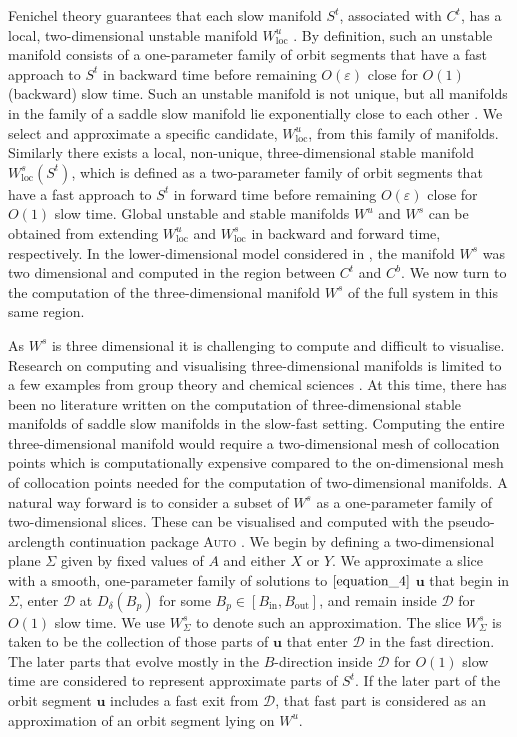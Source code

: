 \documentclass{ws-ijbc}
\begin{document}
Fenichel theory guarantees that each slow manifold $S^t$, associated with $C^t$, has a local, two-dimensional unstable manifold $W_{\mathrm{loc}}^u$ \cite{Fenichel}.  By definition, such an unstable manifold consists of a one-parameter family of orbit segments that have a fast approach to $S^t$ in backward time before remaining $O(\varepsilon)$ close for $O(1)$ (backward) slow time.  Such an unstable manifold is not unique, but all manifolds in the family of a saddle slow manifold lie exponentially close to each other \cite{Fenichel}.  We select and approximate a specific candidate, $W_{\mathrm{loc}}^u$, from this family of manifolds.  Similarly there exists a local, non-unique, three-dimensional stable manifold $W^s_{\mathrm{loc}}(S^t)$, which is defined as a two-parameter family of orbit segments that have a fast approach to $S^t$ in forward time before remaining $O(\varepsilon)$ close for $O(1)$ slow time.  Global unstable and stable manifolds $W^u$ and $W^s$ can be obtained from extending $W^u_{\mathrm{loc}}$ and $W^s_{\mathrm{loc}}$ in backward and forward time, respectively.  In the lower-dimensional model considered in \cite{QSSA}, the manifold $W^s$ was two dimensional and computed in the region between $C^t$ and $C^b$.  We now turn to the computation of the three-dimensional manifold $W^s$ of the full system in this same region.
    
As $W^s$ is three dimensional it is challenging to compute and difficult to visualise.  Research on computing and visualising three-dimensional manifolds is limited to a few examples from group theory and chemical sciences \cite{group_theory, chemistry}.  At this time, there has been no literature written on the computation of three-dimensional stable manifolds of saddle slow manifolds in the slow-fast setting.  Computing the entire three-dimensional manifold would require a two-dimensional mesh of collocation points which is computationally expensive compared to the on-dimensional mesh of collocation points needed for the computation of two-dimensional manifolds. A natural way forward is to consider a subset of $W^s$ as a one-parameter family of two-dimensional slices.  These can be visualised and computed with the pseudo-arclength continuation package \textsc{Auto} \cite{AUTO}.  We begin by defining a two-dimensional plane $\Sigma$ given by fixed values of $A$ and either $X$ or $Y$.  We approximate a slice with a smooth, one-parameter family of solutions to $\ref{equation_4}$ $\mathbf{u}$ that begin in $\Sigma$, enter $\mathscr{D}$ at $D_{\delta}(B_p)$ for some $B_p \in [B_{\text{in}}, B_{\text{out}}]$, and remain inside $\mathscr{D}$ for $O(1)$ slow time.  We use $W^{s}_{\Sigma}$ to denote such an approximation.  The slice $W^{s}_{\Sigma}$ is taken to be the collection of those parts of $\mathbf{u}$ that enter $\mathscr{D}$ in the fast direction.  The later parts that evolve mostly in the $B$-direction inside $\mathscr{D}$ for $O(1)$ slow time are considered to represent approximate parts of $S^t$.  If the later part of the orbit segment $\mathbf{u}$ includes a fast exit from $\mathscr{D}$, that fast part is considered as an approximation of an orbit segment lying on $W^u$.
\end{document}

